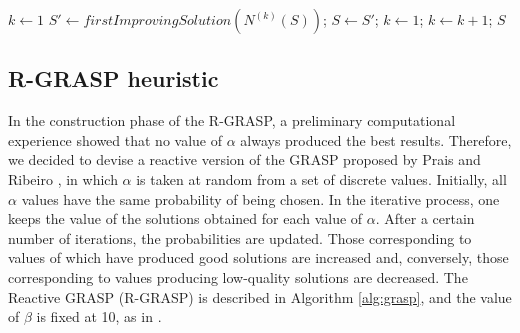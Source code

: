 \documentclass{ro}
\begin{document}
%

\begin{algorithm}
	\caption{\hspace{-1mm}: VND($S$).}
	\label{alg:vnd}
	\begin{algorithmic}[1]		
		\STATE $k \gets 1$
		\STATE $S' \gets firstImprovingSolution(N^{(k)}(S))$;
		\STATE $S \gets S'$;
		\STATE $k \gets 1$;
		\ELSE
		\STATE $k \gets k + 1$;
		\ENDIF
		\ENDWHILE
		\RETURN $S$
	\end{algorithmic}
	
\end{algorithm}

\subsection{R-GRASP heuristic}


In the construction phase of the R-GRASP, a preliminary computational experience showed that no value of $\alpha$ always produced the best results. Therefore, we decided to devise a reactive version of the GRASP proposed by Prais and Ribeiro \cite{prais2000reactive}, in which  $\alpha$ is taken at random from a set of discrete
values. Initially, all $\alpha$ values have the same probability of being chosen. In the iterative process, one keeps the value of the solutions obtained for each value of $\alpha$. After a certain number of iterations, the probabilities are updated. Those corresponding to values of  which have produced good solutions are increased and, conversely, those corresponding to values producing low-quality solutions are decreased. The Reactive GRASP (R-GRASP) is described in Algorithm \ref{alg:grasp}, and the value of $\beta$ is fixed at 10, as in \cite{prais2000reactive}.
\end{document}
